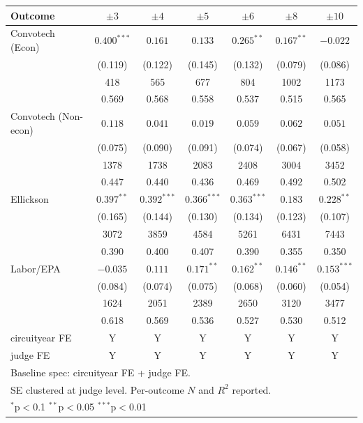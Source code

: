 \begin{tabular}{lcccccc}
\toprule
Outcome & $\pm 3$ & $\pm 4$ & $\pm 5$ & $\pm 6$ & $\pm 8$ & $\pm 10$ \\
\midrule
Convotech (Econ) & \(0.400^{***}\) & \(0.161\) & \(0.133\) & \(0.265^{**}\) & \(0.167^{**}\) & \(-0.022\) \\
 & (0.119) & (0.122) & (0.145) & (0.132) & (0.079) & (0.086) \\
 & 418 & 565 & 677 & 804 & 1002 & 1173 \\
 & 0.569 & 0.568 & 0.558 & 0.537 & 0.515 & 0.565 \\
Convotech (Non-econ) & \(0.118\) & \(0.041\) & \(0.019\) & \(0.059\) & \(0.062\) & \(0.051\) \\
 & (0.075) & (0.090) & (0.091) & (0.074) & (0.067) & (0.058) \\
 & 1378 & 1738 & 2083 & 2408 & 3004 & 3452 \\
 & 0.447 & 0.440 & 0.436 & 0.469 & 0.492 & 0.502 \\
Ellickson & \(0.397^{**}\) & \(0.392^{***}\) & \(0.366^{***}\) & \(0.363^{***}\) & \(0.183\) & \(0.228^{**}\) \\
 & (0.165) & (0.144) & (0.130) & (0.134) & (0.123) & (0.107) \\
 & 3072 & 3859 & 4584 & 5261 & 6431 & 7443 \\
 & 0.390 & 0.400 & 0.407 & 0.390 & 0.355 & 0.350 \\
Labor/EPA & \(-0.035\) & \(0.111\) & \(0.171^{**}\) & \(0.162^{**}\) & \(0.146^{**}\) & \(0.153^{***}\) \\
 & (0.084) & (0.074) & (0.075) & (0.068) & (0.060) & (0.054) \\
 & 1624 & 2051 & 2389 & 2650 & 3120 & 3477 \\
 & 0.618 & 0.569 & 0.536 & 0.527 & 0.530 & 0.512 \\
\midrule
circuityear FE & Y & Y & Y & Y & Y & Y \\
judge FE & Y & Y & Y & Y & Y & Y \\
\bottomrule
\multicolumn{7}{l}{\footnotesize Baseline spec: circuityear FE + judge FE.} \\
\multicolumn{7}{l}{\footnotesize SE clustered at judge level. Per-outcome \(N\) and \(R^{2}\) reported.} \\
\multicolumn{7}{l}{\footnotesize \(^{*}\)p\(<\)0.1 \(^{**}\)p\(<\)0.05 \(^{***}\)p\(<\)0.01} \\
\end{tabular}
